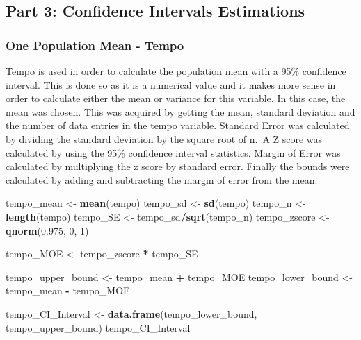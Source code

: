 \documentclass[
]{article}
\newenvironment{Shaded}{\begin{snugshade}}{\end{snugshade}}
\newcommand{\DecValTok}[1]{\textcolor[rgb]{0.00,0.00,0.81}{#1}}
\newcommand{\FloatTok}[1]{\textcolor[rgb]{0.00,0.00,0.81}{#1}}
\newcommand{\KeywordTok}[1]{\textcolor[rgb]{0.13,0.29,0.53}{\textbf{#1}}}
\newcommand{\NormalTok}[1]{#1}
\newcommand{\OperatorTok}[1]{\textcolor[rgb]{0.81,0.36,0.00}{\textbf{#1}}}
\newcommand{\StringTok}[1]{\textcolor[rgb]{0.31,0.60,0.02}{#1}}
\begin{document}
\hypertarget{part-3-confidence-intervals-estimations}{%
\subsection{Part 3: Confidence Intervals
Estimations}\label{part-3-confidence-intervals-estimations}}

\hypertarget{one-population-mean---tempo}{%
\subsubsection{One Population Mean -
Tempo}\label{one-population-mean---tempo}}

Tempo is used in order to calculate the population mean with a 95\%
confidence interval. This is done so as it is a numerical value and it
makes more sense in order to calculate either the mean or variance for
this variable. In this case, the mean was chosen. This was acquired by
getting the mean, standard deviation and the number of data entries in
the tempo variable. Standard Error was calculated by dividing the
standard deviation by the square root of n.~A Z score was calculated by
using the 95\% confidence interval statistics. Margin of Error was
calculated by multiplying the z score by standard error. Finally the
bounds were calculated by adding and subtracting the margin of error
from the mean.

\begin{Shaded}
\begin{Highlighting}[]
\NormalTok{tempo_mean <-}\StringTok{ }\KeywordTok{mean}\NormalTok{(tempo)}
\NormalTok{tempo_sd <-}\StringTok{ }\KeywordTok{sd}\NormalTok{(tempo)}
\NormalTok{tempo_n <-}\StringTok{ }\KeywordTok{length}\NormalTok{(tempo)}
\NormalTok{tempo_SE <-}\StringTok{ }\NormalTok{tempo_sd}\OperatorTok{/}\KeywordTok{sqrt}\NormalTok{(tempo_n)}
\NormalTok{tempo_zscore <-}\StringTok{ }\KeywordTok{qnorm}\NormalTok{(}\FloatTok{0.975}\NormalTok{, }\DecValTok{0}\NormalTok{, }\DecValTok{1}\NormalTok{)}

\NormalTok{tempo_MOE <-}\StringTok{ }\NormalTok{tempo_zscore }\OperatorTok{*}\StringTok{ }\NormalTok{tempo_SE}

\NormalTok{tempo_upper_bound <-}\StringTok{ }\NormalTok{tempo_mean }\OperatorTok{+}\StringTok{ }\NormalTok{tempo_MOE}
\NormalTok{tempo_lower_bound <-}\StringTok{ }\NormalTok{tempo_mean }\OperatorTok{-}\StringTok{ }\NormalTok{tempo_MOE}

\NormalTok{tempo_CI_Interval <-}\StringTok{ }\KeywordTok{data.frame}\NormalTok{(tempo_lower_bound, tempo_upper_bound)}
\NormalTok{tempo_CI_Interval}
\end{Highlighting}
\end{Shaded}
\end{document}
